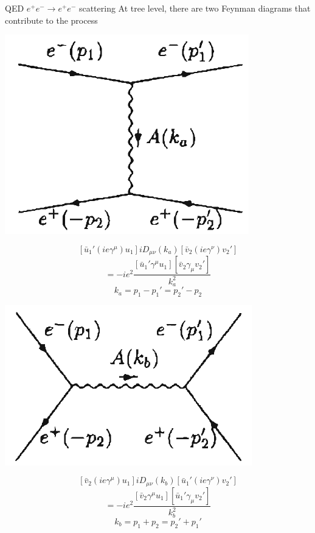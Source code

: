 \documentclass{../bredelebeamer}
\begin{document}
\begin{frame}{QED $e^+e^- \longrightarrow e^+e^-$ scattering}
    At tree level, there are two Feynman diagrams that contribute to the process
    \begin{minipage}{0.45\textwidth}
        \begin{center}
            \includegraphics[width=.6\textwidth]{Tchannel_ee_ee.png}
        \end{center}
        $$
            \left[\bar u_1'(ie\gamma^\mu) u_1\right]
            iD_{\mu\nu}(k_a)
            \left[\bar v_2(ie\gamma^\nu) v_2'\right]
        $$
        $$
            =-ie^2\frac{\left[ \bar u_1' \gamma^\mu u_1 \right]\left[ \bar v_2 \gamma_\mu v_2' \right]}{k_a^2}
        $$
        $$
            k_a = p_1 - p_1' = p_2' - p_2
        $$
    \end{minipage}\hfill
    \begin{minipage}{0.45\textwidth}
        \begin{center}
            \includegraphics[width=.6\textwidth]{Schannel_ee_ee.png}
        \end{center}
        \vspace{15pt}
        $$
            \left[\bar v_2(ie\gamma^\mu) u_1\right]
            iD_{\mu\nu}(k_b)
            \left[\bar u_1'(ie\gamma^\nu) v_2'\right]
        $$
        $$
            =-ie^2\frac{\left[ \bar v_2 \gamma^\mu u_1 \right]\left[ \bar u_1' \gamma_\mu v_2' \right]}{k_b^2}
        $$
        $$
            k_b = p_1 + p_2 = p_2' + p_1'
        $$
    \end{minipage}


\end{frame}
\end{document}
